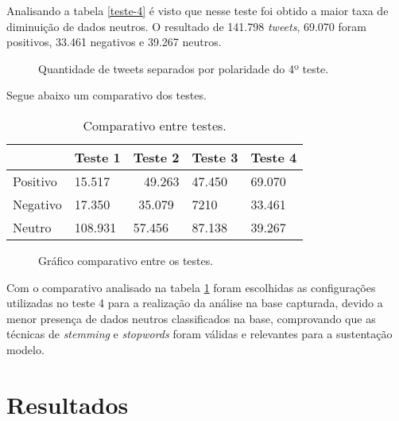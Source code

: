 Analisando a tabela \ref{teste-4} é visto que nesse teste foi obtido a maior taxa de diminuição de dados neutros. O resultado de 141.798 \textit{tweets}, 69.070 foram positivos, 33.461 negativos e 39.267 neutros.


\begin{figure}[H]
	\centering{}
	\caption{Quantidade de tweets separados por polaridade do 4º teste.}
	\label{teste-graf-4}
\end{figure}

Segue abaixo um comparativo dos testes.

\begin{table}[H]		
	\centering
	\caption{Comparativo entre testes.}
	\label{teste-comp}
	\begin{tabular}{l|l|c|l|l|}
		\cline{2-5}
		\multicolumn{1}{c|}{} & \multicolumn{1}{c|}{Teste 1} & Teste 2 & \multicolumn{1}{c|}{Teste 3} & \multicolumn{1}{c|}{Teste 4} \\ \hline
		\multicolumn{1}{|l|}{Positivo} & 15.517 & \multicolumn{1}{r|}{49.263} & 47.450 & 69.070 \\ \hline
		\multicolumn{1}{|l|}{Negativo} & 17.350 & 35.079 & 7210 & 33.461 \\ \hline
		\multicolumn{1}{|l|}{Neutro} & 108.931 & \multicolumn{1}{l|}{57.456} & 87.138 & 39.267 \\ \hline
	
	\end{tabular}
\end{table}

\begin{figure}[H]
	\centering{}
	\caption{Gráfico comparativo entre os testes.}
	\label{teste-graf-comp}
\end{figure}


Com o comparativo analisado na tabela \ref{teste-comp} foram escolhidas as configurações utilizadas no teste 4 para a realização da análise na base capturada, devido a menor presença de dados neutros classificados na base, comprovando que as técnicas de \textit{stemming} e \textit{stopwords} foram válidas e relevantes para a sustentação modelo.

\section{Resultados}\label{result}

